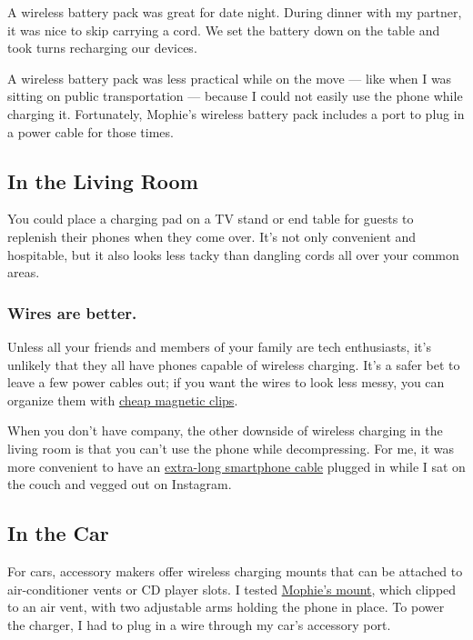 A wireless battery pack was great for date night. During dinner with my
partner, it was nice to skip carrying a cord. We set the battery down on
the table and took turns recharging our devices.

A wireless battery pack was less practical while on the move --- like
when I was sitting on public transportation --- because I could not
easily use the phone while charging it. Fortunately, Mophie's wireless
battery pack includes a port to plug in a power cable for those times.

\hypertarget{in-the-living-room}{%
\subsection{In the Living Room}\label{in-the-living-room}}

You could place a charging pad on a TV stand or end table for guests to
replenish their phones when they come over. It's not only convenient and
hospitable, but it also looks less tacky than dangling cords all over
your common areas.

\hypertarget{wires-are-better}{%
\subsubsection{Wires are better.}\label{wires-are-better}}

Unless all your friends and members of your family are tech enthusiasts,
it's unlikely that they all have phones capable of wireless charging.
It's a safer bet to leave a few power cables out; if you want the wires
to look less messy, you can organize them with
\href{https://www.amazon.com/gp/product/B07B4S4H5C/ref=oh_aui_search_detailpage?ie=UTF8\&psc=1}{cheap
magnetic clips}.

When you don't have company, the other downside of wireless charging in
the living room is that you can't use the phone while decompressing. For
me, it was more convenient to have an
\href{https://www.nytimes3xbfgragh.onion/2018/05/03/smarter-living/good-10-foot-charging-cables-tech.html}{extra-long
smartphone cable} plugged in while I sat on the couch and vegged out on
Instagram.

\hypertarget{in-the-car}{%
\subsection{In the Car}\label{in-the-car}}

For cars, accessory makers offer wireless charging mounts that can be
attached to air-conditioner vents or CD player slots. I tested
\href{http://www.mophie.com/shop/charge-stream-vent-mount}{Mophie's
mount}, which clipped to an air vent, with two adjustable arms holding
the phone in place. To power the charger, I had to plug in a wire
through my car's accessory port.

